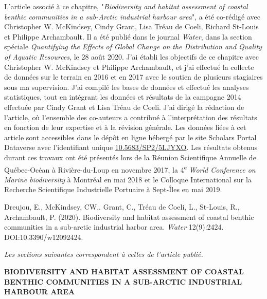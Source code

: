 L'article associé à ce chapitre, "\textit{Biodiversity and habitat assessment of coastal benthic communities in a sub-Arctic industrial harbour area}", a été co-rédigé avec Christopher W. McKindsey, Cindy Grant, Lisa Tréau de Coeli, Richard St-Louis et Philippe Archambault. Il a été publié dans le journal \textit{Water}, dans la section spéciale \textit{Quantifying the Effects of Global Change on the Distribution and Quality of Aquatic Resources}, le 28 août 2020. J'ai établi les objectifs de ce chapitre avec Christopher W. McKindsey et Philippe Archambault, et j'ai effectué la collecte de données sur le terrain en 2016 et en 2017 avec le soutien de plusieurs stagiaires sous ma supervision. J'ai compilé les bases de données et effectué les analyses statistiques, tout en intégrant les données et résultats de la campagne 2014 effectuée par Cindy Grant et Lisa Tréau de Coeli. J'ai dirigé la rédaction de l'article, où l'ensemble des co-auteurs a contribué à l'interprétation des résultats en fonction de leur expertise et à la révision générale. Les données liées à cet article sont accessibles dans le dépôt en ligne hébergé par le site Scholars Portal Dataverse avec l'identifiant unique \href{https://doi.org/10.5683/SP2/5LJYXO}{10.5683/SP2/5LJYXO}. Les résultats obtenus durant ces travaux ont été présentés lors de la Réunion Scientifique Annuelle de Québec-Océan à Rivière-du-Loup en novembre 2017, la 4\textsuperscript{e} \textit{World Conference on Marine biodiversity} à Montréal en mai 2018 et le Colloque International sur la Recherche Scientifique Industrielle Portuaire à Sept-Îles en mai 2019.
\linebreak[4]

\begin{singlespace}
Dreujou, E., McKindsey, CW,. Grant, C., Tréau de Coeli, L., St-Louis, R., Archambault, P. (2020). Biodiversity and habitat assessment of coastal benthic communities in a sub-arctic industrial harbor area. \textit{Water} 12(9):2424. DOI:10.3390/w12092424.
\end{singlespace}

\textit{Les sections suivantes correspondent à celles de l'article publié.}

\clearpage

\begin{center}
\textbf{BIODIVERSITY AND HABITAT ASSESSMENT OF COASTAL BENTHIC COMMUNITIES IN A SUB-ARCTIC INDUSTRIAL HARBOUR AREA}
\end{center}
